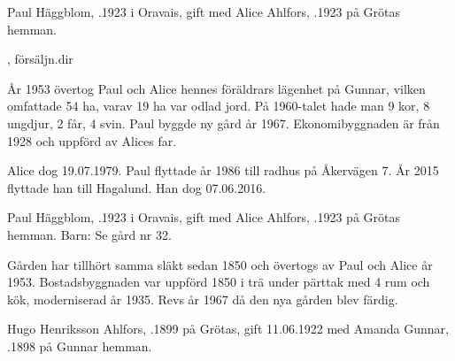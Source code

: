 %
Paul Häggblom, .1923 i Oravais, gift med Alice Ahlfors, .1923 på Grötas hemman.
\begin{jhchildren}
  \item {}
  \item {}, försäljn.dir
  \item {}
  \item {}
  \item {}
\end{jhchildren}

År 1953 övertog Paul och Alice hennes föräldrars lägenhet på Gunnar, vilken omfattade 54 ha, varav 19 ha var odlad jord. På 1960-talet hade man 9 kor, 8 ungdjur, 2 får, 4 svin. Paul byggde ny gård år 1967. Ekonomibyggnaden är från 1928 och uppförd av Alices far.

Alice dog 19.07.1979. Paul flyttade år 1986 till radhus på Åkervägen 7. År 2015 flyttade han till Hagalund. Han dog 07.06.2016.


%


%
Paul Häggblom, .1923 i Oravais, gift med Alice Ahlfors, .1923 på Grötas hemman. Barn: Se gård nr 32.

Gården har tillhört samma släkt sedan 1850 och övertogs av Paul och Alice år 1953. Bostadsbyggnaden var uppförd 1850 i trä under pärttak med 4 rum och kök, moderniserad år 1935. Revs år 1967 då den nya gården blev färdig.


%
Hugo Henriksson Ahlfors, .1899 på Grötas, gift 11.06.1922 med Amanda Gunnar, .1898 på Gunnar hemman.
\begin{jhchildren}
  \item {}
  \item {}
\end{jhchildren}


